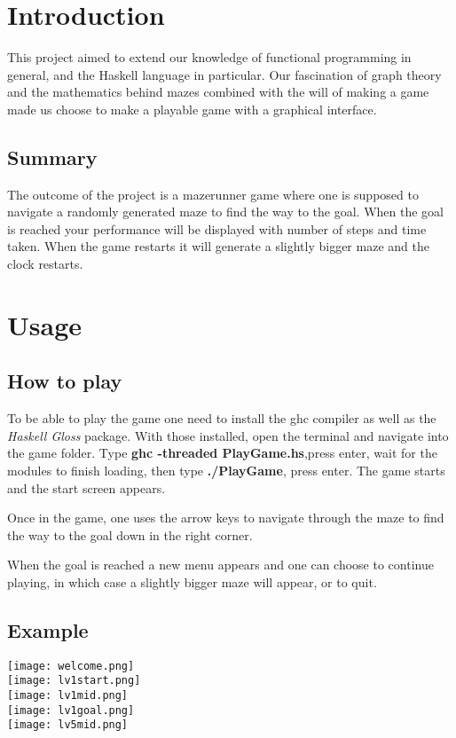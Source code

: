 \documentclass[12pt, a4paper]{article}
\begin{document}
\maketitle
\newpage


\tableofcontents


\newpage
\section{Introduction}
This project aimed to extend our knowledge of functional programming in general, and the Haskell language in particular. Our fascination of graph theory and the mathematics behind mazes combined with the will of making a game made us choose to make a playable game with a graphical interface.


\subsection{Summary}
The outcome of the project is a mazerunner game where one is supposed to navigate a randomly generated maze to find the way to the goal. When the goal is reached your performance will be displayed with number of steps and time taken. When the game restarts it will generate a slightly bigger maze and the clock restarts.


\section{Usage}
\subsection{How to play}
To be able to play the game one need to install the ghc compiler as well as the \textit{Haskell Gloss} package. With those installed, open the terminal and navigate into the game folder. Type \textbf{ghc -threaded PlayGame.hs},press enter, wait for the modules to finish loading, then type \textbf{./PlayGame}, press enter. The game starts and the start screen appears.


Once in the game, one uses the arrow keys to navigate through the maze to find the way to the goal down in the right corner. 

When the goal is reached a new menu appears and one can choose to continue playing, in which case a slightly bigger maze will appear, or to quit.


\subsection{Example}
\texttt{[image: welcome.png]}\\
\texttt{[image: lv1start.png]}\\
\texttt{[image: lv1mid.png]}\\
\texttt{[image: lv1goal.png]}\\
\texttt{[image: lv5mid.png]}\\
\end{document}
